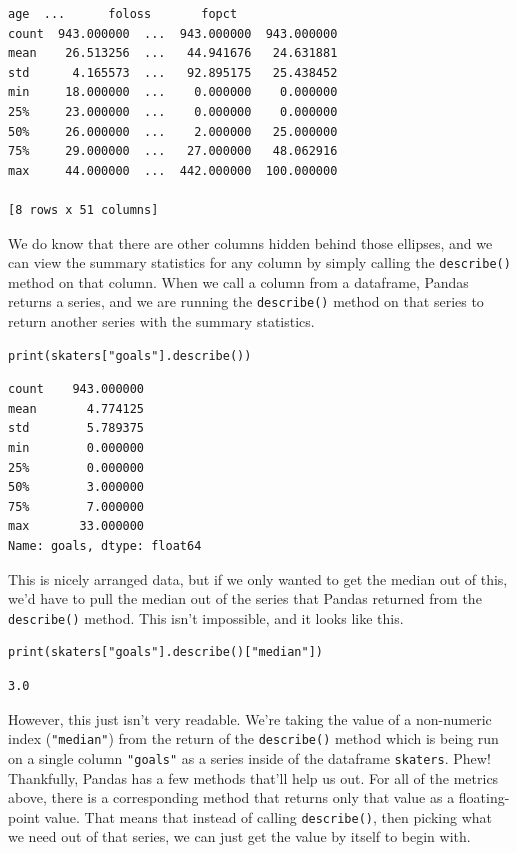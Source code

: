 \begin{lstlisting}[style=none]
              age  ...      foloss       fopct
count  943.000000  ...  943.000000  943.000000
mean    26.513256  ...   44.941676   24.631881
std      4.165573  ...   92.895175   25.438452
min     18.000000  ...    0.000000    0.000000
25%     23.000000  ...    0.000000    0.000000
50%     26.000000  ...    2.000000   25.000000
75%     29.000000  ...   27.000000   48.062916
max     44.000000  ...  442.000000  100.000000

[8 rows x 51 columns]
\end{lstlisting}
We do know that there are other columns hidden behind those ellipses, and we can view the summary statistics for any column by simply calling the \verb|describe()| method on that column. When we call a column from a dataframe, Pandas returns a series, and we are running the \verb|describe()| method on that series to return another series with the summary statistics.\par
\begin{lstlisting}[style=pippython]
print(skaters["goals"].describe())
\end{lstlisting}
\begin{lstlisting}[style=none]
count    943.000000
mean       4.774125
std        5.789375
min        0.000000
25%        0.000000
50%        3.000000
75%        7.000000
max       33.000000
Name: goals, dtype: float64
\end{lstlisting}
This is nicely arranged data, but if we only wanted to get the median out of this, we'd have to pull the median out of the series that Pandas returned from the \verb|describe()| method. This isn't impossible, and it looks like this.
\begin{lstlisting}[style=pippython]
print(skaters["goals"].describe()["median"])
\end{lstlisting}
\begin{lstlisting}[style=none]
3.0
\end{lstlisting}
However, this just isn't very readable. We're taking the value of a non-numeric index (\verb|"median"|) from the return of the \verb|describe()| method which is being run on a single column \verb|"goals"| as a series inside of the dataframe \verb|skaters|. Phew! Thankfully, Pandas has a few methods that'll help us out. For all of the metrics above, there is a corresponding method that returns only that value as a floating-point value. That means that instead of calling \verb|describe()|, then picking what we need out of that series, we can just get the value by itself to begin with.\par
